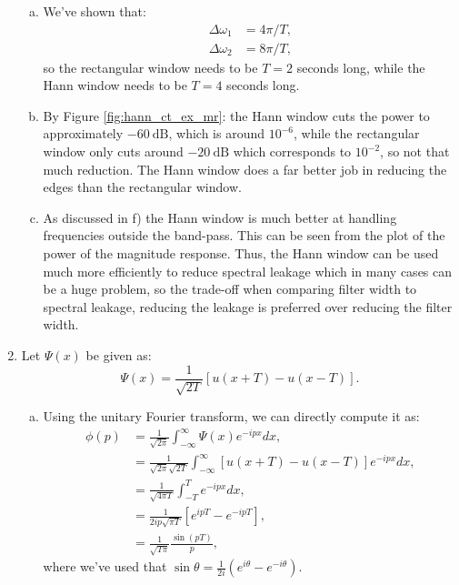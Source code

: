 \begin{enumerate}
\begin{enumerate}[a)]
\item We've shown that:
\begin{align*}
    \Delta\omega_{1}&=4\pi/T, \\
    \Delta\omega_{2}&=8\pi/T,
\end{align*}
so the rectangular window needs to be $T=2$ seconds long, while the Hann window needs to be $T=4$ seconds long. 

\item By Figure \ref{fig:hann_ct_ex_mr}: the Hann window cuts the power to approximately $-60\ \text{dB}$, 
which is around $10^{-6}$, while the rectangular window only cuts around $-20\ \text{dB}$ which corresponds to $10^{-2}$, so not that much reduction. The Hann window does a far better job in reducing the edges than the rectangular window.

\item As discussed in f) the Hann window is much better at handling frequencies outside the band-pass. 
This can be seen from the plot of the power of the magnitude response. Thus, the Hann window can be used much more efficiently
 to reduce spectral leakage which in many cases can be a huge problem, so the trade-off when comparing filter width to spectral 
 leakage, reducing the leakage is preferred over reducing the filter width.


\end{enumerate}

\item Let $\Psi(x)$ be given as:
\begin{equation*}
\Psi(x) = \frac{1}{\sqrt{2T}}[u(x + T) - u(x - T)].
\end{equation*}

\begin{enumerate}[a)]
\item Using the unitary Fourier transform, we can directly compute it as:
\begin{align*}
    \phi(p) &= \frac{1}{\sqrt{2\pi}}\int_{-\infty}^{\infty}\Psi(x)e^{-ip x}dx, \\
            &= \frac{1}{\sqrt{2\pi}\sqrt{2T}}\int_{-\infty}^{\infty} [u(x+T) - u(x-T)]e^{-ip x}dx, \\
            &= \frac{1}{\sqrt{4\pi T}}\int_{-T}^{T}e^{-ip x}dx, \\
            &= \frac{1}{2ip\sqrt{\pi T}}[e^{ip T} - e^{-ip T}], \\
            &= \frac{1}{\sqrt{T\pi }}\frac{\sin(p T)}{p},
\end{align*}
where we've used that $\sin\theta = \frac{1}{2i}(e^{i\theta}-e^{-i\theta})$.


\end{enumerate}
\end{enumerate}
